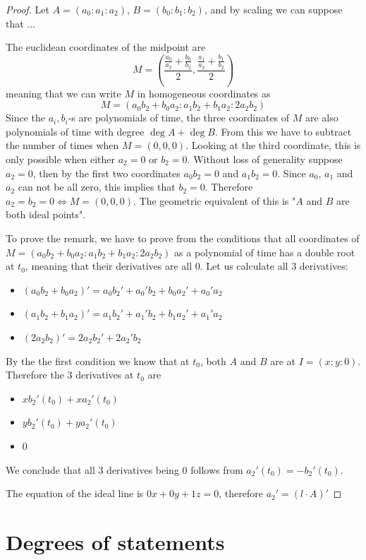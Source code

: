 \documentclass[a4paper]{article}
\begin{document}
\begin{proof}
    Let $A=(a_0:a_1:a_2)$, $B=(b_0: b_1: b_2)$, and by scaling we can suppose that ...

    The euclidean coordinates of the midpoint are
    $$M=\left(\frac{\frac{a_0}{a_2}+\frac{b_0}{b_2}}{2},\frac{\frac{a_1}{a_2}+\frac{b_1}{b_2}}{2}\right)$$
    meaning that we can write $M$ in homogeneous coordinates as
    $$M=(a_0b_2+b_0a_2:a_1b_2+b_1a_2:2a_2b_2)$$
    Since the $a_i,b_i$-s are polynomials of time, the three coordinates of $M$ are also polynomials of time with degree $\deg A+\deg B$. From this we have to subtract the number of times when $M=(0,0,0)$.
    Looking at the third coordinate, this is only possible when either $a_2=0$ or $b_2=0$. Without loss of generality suppose $a_2=0$, then by the first two coordinates $a_0b_2=0$ and $a_1b_2=0$. Since $a_0$, $a_1$ and $a_2$ can not be all zero, this implies that $b_2=0$. Therefore $a_2=b_2=0\iff M=(0,0,0)$. The geometric equivalent of this is "$A$ and $B$ are both ideal points".

    To prove the remark, we have to prove from the conditions that all coordinates of $M=(a_0b_2+b_0a_2:a_1b_2+b_1a_2:2a_2b_2)$ as a polynomial of time has a double root at $t_0$, meaning that their derivatives are all 0.
    Let us calculate all 3 derivatives:
    \begin{itemize}
        \item $(a_0b_2+b_0a_2)'=a_0b_2'+a_0'b_2+b_0a_2'+a_0'a_2$
        \item $(a_1b_2+b_1a_2)'=a_1b_2'+a_1'b_2+b_1a_2'+a_1'a_2$
        \item $(2a_2b_2)'=2a_2b_2'+2a_2'b_2$
    \end{itemize}
    By the the first condition we know that at $t_0$, both $A$ and $B$ are at $I=(x:y:0)$. Therefore the 3 derivatives at $t_0$ are
    \begin{itemize}
        \item $xb_2'(t_0)+xa_2'(t_0)$
        \item $yb_2'(t_0)+ya_2'(t_0)$
        \item $0$
    \end{itemize}
    We conclude that all 3 derivatives being 0 follows from $a_2'(t_0)=-b_2'(t_0)$.

    The equation of the ideal line is $0x+0y+1z=0$, therefore $a_2'=(l\cdot A)'$
\end{proof}

\section{Degrees of statements}
\end{document}
